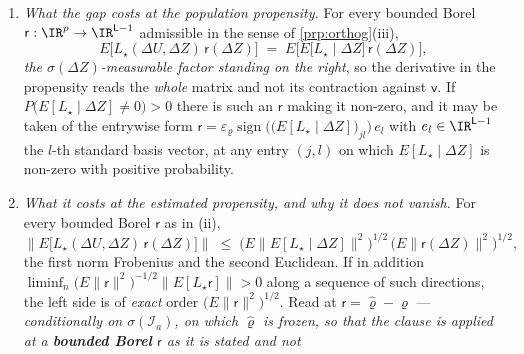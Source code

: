 \begin{corollary}
\begin{enumerate}
$\mathsf f:\IR^{p}\to\IR^{p}$ be Borel with $E\|\mathsf f(\Delta Z)\|^{2}<\infty$ and
$P\big(\mathsf f(\Delta Z)\ne0\big)>0$. Then
$L:=L^{\,b}_{\ell_\star}$ with $b(z):=b_{\mathrm{N1}}(z)+\mathsf f(z)\,(\mathsf v^{\perp})'$, a Borel map
$\IR^{p}\to\IR^{p\times(\mathsf L-1)}$ --- \emph{the \textbf{outer} product of the $\IR^{p}$-valued
$\mathsf f(z)$ with the $\IR^{\mathsf L-1}$-valued $\mathsf v^{\perp}$, and not $\mathsf f$ evaluated at
$\mathsf v^{\perp}$, which is not even typed} --- is, in the sense of
\cref{def:weight}\textup{(b)}, an admissible weight with $\partial_uL=\ell_\star$, it satisfies the
contracted condition at $\mathsf v$, and it violates N1 on an event of positive probability.
\item[(ii)] \emph{What the gap costs at the population propensity.} For every bounded Borel
$\mathsf r:\IR^{p}\to\IR^{\mathsf L-1}$ admissible in the sense of \cref{prp:orthog}\textup{(iii)},
\[
E\big[L_\star(\Delta U,\Delta Z)\,\mathsf r(\Delta Z)\big]
\;=\;E\Big[E\big[L_\star\mid\Delta Z\big]\,\mathsf r(\Delta Z)\Big] ,
\]
\emph{the $\sigma(\Delta Z)$-measurable factor standing on the right}, so the derivative in the
propensity reads the \emph{whole} matrix and not its contraction against $\mathsf v$. If
$P\big(E[L_\star\mid\Delta Z]\ne0\big)>0$ there is such an $\mathsf r$ making it non-zero, and it may be
taken of the entrywise form
$\mathsf r=\varepsilon_\varrho\operatorname{sign}\big(\big(E[L_\star\mid\Delta Z]\big)_{jl}\big)\,e_l$
with $e_l\in\IR^{\mathsf L-1}$ the $l$-th standard basis vector, at any entry $(j,l)$ on which
$E[L_\star\mid\Delta Z]$ is non-zero with positive probability.
\item[(iii)] \emph{What it costs at the estimated propensity, and why it does not vanish.} For every
bounded Borel $\mathsf r$ as in \textup{(ii)},
\begin{equation}\label{eq:centaritycost}
\Big\|E\big[L_\star(\Delta U,\Delta Z)\,\mathsf r(\Delta Z)\big]\Big\|
\;\le\;\Big(E\big\|E[L_\star\mid\Delta Z]\big\|^{2}\Big)^{1/2}\,
\big(E\|\mathsf r(\Delta Z)\|^{2}\big)^{1/2} ,
\end{equation}
the first norm Frobenius and the second Euclidean. If in addition
$\liminf_n\big(E\|\mathsf r\|^{2}\big)^{-1/2}\big\|E[L_\star\mathsf r]\big\|>0$ along a sequence of such
directions, the left side is of \emph{exact} order $\big(E\|\mathsf r\|^{2}\big)^{1/2}$. Read at
$\mathsf r=\hat\varrho-\varrho$ --- \emph{conditionally on $\sigma(\mathcal I_a)$, on which $\hat\varrho$
is frozen, so that the clause is applied at a \textbf{bounded Borel} $\mathsf r$ as it is stated and not
}
\end{enumerate}
\end{corollary}
